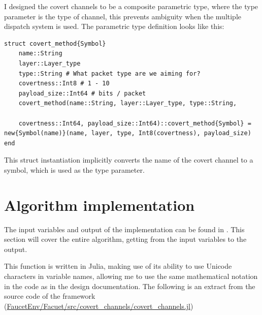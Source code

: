 I designed the covert channels to be a composite parametric type, where the type parameter is the type of channel, this prevents ambiguity when the multiple dispatch system is used. The parametric type definition looks like this:

\begin{lstlisting}[language=JuliaLocal, style=julia]
struct covert_method{Symbol}
    name::String
    layer::Layer_type
    type::String # What packet type are we aiming for?
    covertness::Int8 # 1 - 10
    payload_size::Int64 # bits / packet
    covert_method(name::String, layer::Layer_type, type::String, 
    
    covertness::Int64, payload_size::Int64)::covert_method{Symbol} = new{Symbol(name)}(name, layer, type, Int8(covertness), payload_size)
end
\end{lstlisting}

This struct instantiation implicitly converts the name of the covert channel to a symbol, which is used as the type parameter.

\section{Algorithm implementation}
\label{sec:algorithm_impl}

The input variables and output of the implementation can be found in . This section will cover the entire algorithm, getting from the input variables to the output.

This function is written in Julia, making use of its ability to use Unicode characters in variable names, allowing me to use the same mathematical notation in the code as in the design documentation. The following is an extract from the source code of the framework (\url{FaucetEnv/Facuet/src/covert_channels/covert_channels.jl})

